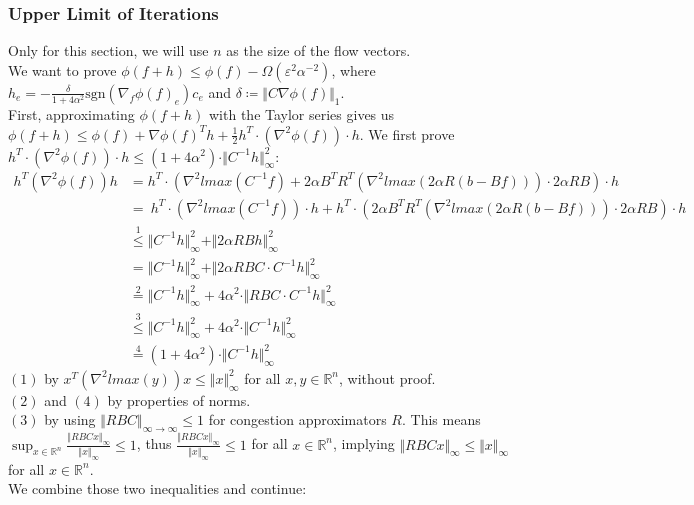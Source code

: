 \subsubsection{Upper Limit of Iterations}
\label{sec_math_uli}
Only for this section, we will use $n$ as the size of the flow vectors.\\
We want to prove $\phi(f+h)\leq \phi(f)-\Omega(\varepsilon^2\alpha^{-2})$, where $h_e=-\frac{\delta}{1+4\alpha^2}\text{sgn}(\nabla_f\phi(f)_e)c_e$ and $\delta \coloneqq\Vert C\nabla\phi(f)\Vert_1$.\\
First, approximating $\phi(f+h)$ with the Taylor series gives us $\phi(f+h)\leq \phi(f)+\nabla\phi(f)^Th+\frac{1}{2}h^T\cdot \left(\nabla^2\phi(f)\right) \cdot h$. We first prove $h^T\cdot \left(\nabla^2\phi(f)\right)\cdot h\leq (1+4\alpha^2)\cdot \Vert C^{-1}h\Vert_\infty^2$:
\begin{align*}
h^T\left(\nabla^2\phi(f)\right) h&=h^T\cdot\left(\nabla^2 lmax(C^{-1}f)+2\alpha B^TR^T\left(\nabla^2 lmax(2\alpha R(b-Bf))\right)\cdot 2\alpha RB\right)\cdot h\\
&=~\scriptstyle h^T\cdot\left(\nabla^2 lmax(C^{-1}f)\right)\cdot h+h^T\cdot\left(2\alpha B^TR^T\left(\nabla^2 lmax(2\alpha R(b-Bf))\right)\cdot 2\alpha RB\right)\cdot h\\
&\stackrel{1}{\leq} \Vert C^{-1}h\Vert_\infty^2+\Vert 2\alpha RBh\Vert_\infty^2\\
&=\Vert C^{-1}h\Vert_\infty^2+\Vert 2\alpha RBC\cdot C^{-1}h\Vert_\infty^2\\
&\stackrel{2}{=}\Vert C^{-1}h\Vert_\infty^2+4\alpha^2\cdot \Vert RBC\cdot C^{-1}h\Vert_\infty^2\\
&\stackrel{3}{\leq} \Vert C^{-1}h\Vert_\infty^2+4\alpha^2\cdot \Vert C^{-1}h\Vert_\infty^2\\
&\stackrel{4}{=} (1+4\alpha^2)\cdot \Vert C^{-1}h\Vert_\infty^2
\end{align*}
$(1)$ by $x^T(\nabla^2 lmax(y))x\leq \Vert x\Vert_\infty^2$ for all $x,y\in\mathbb{R}^n$, without proof.\\
$(2)$ and $(4)$ by properties of norms.\\
$(3)$ by using $\Vert RBC\Vert_{\infty\rightarrow\infty}\leq 1$ for congestion approximators $R$. This means $\sup_{x\in\mathbb{R}^n}\frac{\Vert RBCx\Vert_\infty}{\Vert x\Vert_\infty}\leq 1$, thus $\frac{\Vert RBCx\Vert_\infty}{\Vert x\Vert_\infty}\leq 1$ for all $x\in\mathbb{R}^n$, implying $\Vert RBCx\Vert_\infty\leq \Vert x\Vert_\infty$ for all $x\in\mathbb{R}^n$.\\
We combine those two inequalities and continue:
